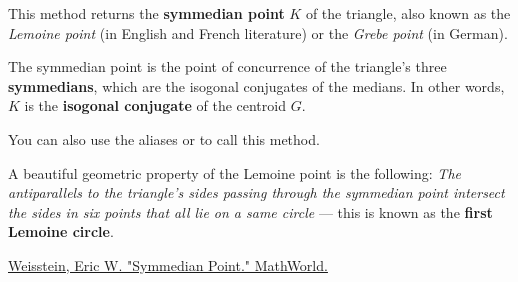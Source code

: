 This method returns the \textbf{symmedian point} $K$ of the triangle, also known as the \emph{Lemoine point} (in English and French literature) or the \emph{Grebe point} (in German).

\medskip
\noindent
The symmedian point is the point of concurrence of the triangle’s three \textbf{symmedians}, which are the isogonal conjugates of the medians. In other words, $K$ is the \textbf{isogonal conjugate} of the centroid $G$.

\medskip
\noindent
You can also use the aliases  or  to call this method.

\medskip
\noindent
A beautiful geometric property of the Lemoine point is the following:
\textit{The antiparallels to the triangle’s sides passing through the symmedian point intersect the sides in six points that all lie on a same circle} — this is known as the \textbf{first Lemoine circle}.
\begin{flushright}
\small
\href{https://mathworld.wolfram.com/SymmedianPoint.html}{Weisstein, Eric W. "Symmedian Point." MathWorld.}
\end{flushright}
\label{sub:antiparallel_through_lemoine_point}

\vspace{1em}
\begin{minipage}{.5\textwidth}
\begin{center}
\end{center}
\end{minipage}
\begin{minipage}{.5\textwidth}
\begin{tkzexample}
\end{tkzexample}
\end{minipage}

